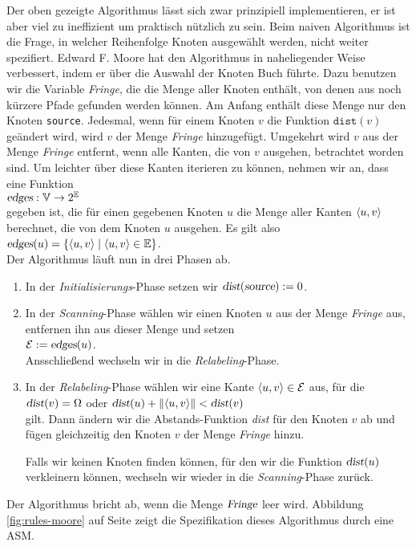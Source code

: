 \noindent
Der oben gezeigte Algorithmus l\"asst sich zwar prinzipiell implementieren, er ist aber 
viel zu ineffizient um praktisch n\"utzlich zu sein.
Beim naiven Algorithmus ist die Frage, in welcher Reihenfolge Knoten ausgew\"ahlt werden,
nicht weiter spezifiert.   Edward F. Moore \cite{moore:59} hat den Algorithmus in naheliegender Weise
verbessert,  indem er \"uber die Auswahl der Knoten Buch f\"uhrte.  
Dazu benutzen wir die Variable \textsl{Fringe}, die die Menge aller Knoten enth\"alt, von denen aus
noch k\"urzere Pfade gefunden werden k\"onnen.  Am Anfang enth\"alt diese Menge nur den Knoten
\texttt{source}.  Jedesmal, wenn f\"ur einem Knoten $v$ die Funktion
$\mathtt{dist}(v)$ ge\"andert wird, wird $v$ der Menge \textsl{Fringe} hinzugef\"ugt.
Umgekehrt wird $v$ aus der Menge \textsl{Fringe} entfernt, wenn alle Kanten, die von $v$
ausgehen, betrachtet worden sind.  Um leichter \"uber diese Kanten iterieren zu k\"onnen,
nehmen wir an, dass eine Funktion \\[0.2cm]
\hspace*{1.3cm} $\textsl{edges}: {\mathbb V} \rightarrow 2^{{\mathbb E}}$ \\[0.2cm]
gegeben ist, die f\"ur einen gegebenen Knoten $u$ die Menge aller Kanten $\pair(u,v)$
berechnet, die von dem Knoten $u$ ausgehen.  Es gilt also \\[0.2cm]
\hspace*{1.3cm} $\textsl{edges}(u) = \{ \pair(u,v) \mid \pair(u,v) \in \edges \}$.
\\[0.2cm]
Der Algorithmus l\"auft nun in drei Phasen ab.
\begin{enumerate}
\item In der \emph{Initialisierungs}-Phase setzen wir $\textsl{dist}(\textsl{source}) := 0$.
\item In der \emph{Scanning}-Phase w\"ahlen wir einen Knoten $u$ aus der Menge \textsl{Fringe} aus,
      entfernen ihn aus dieser Menge und setzen \\[0.2cm]
      \hspace*{1.3cm} ${\cal E} := \textsl{edges}(u)$. \\[0.2cm]
      Ansschlie{\ss}end wechseln wir in die \emph{Relabeling}-Phase.
\item In der \emph{Relabeling}-Phase w\"ahlen wir eine Kante 
      $\pair(u,v) \in {\cal E}$ aus, f\"ur die \\[0.2cm]
      \hspace*{1.3cm} $\textsl{dist}(v)=\Omega$ \quad oder \quad
      $\textsl{dist}(u) + \|\langle{}u,v\rangle\| < \textsl{dist}(v)$ \\[0.2cm]
      gilt.  Dann \"andern wir die Abstands-Funktion \textsl{dist} f\"ur den Knoten $v$ ab
      und f\"ugen gleichzeitig den Knoten $v$ der Menge \textsl{Fringe} hinzu.

      Falls wir keinen Knoten finden k\"onnen, f\"ur den wir die 
      Funktion $\textsl{dist}(u)$ verkleinern k\"onnen, wechseln wir wieder in die \emph{Scanning}-Phase zur\"uck.
\end{enumerate}
Der Algorithmus bricht ab, wenn die Menge $\textsl{Fringe}$ leer wird.
Abbildung \ref{fig:rules-moore} auf Seite \pageref{fig:rules-moore} zeigt die
Spezifikation dieses Algorithmus durch eine ASM.

